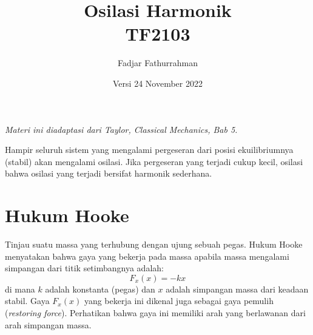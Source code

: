 




\title{Osilasi Harmonik \\
TF2103}
\author{Fadjar Fathurrahman}
\date{Versi 24 November 2022}
\maketitle

\emph{Materi ini diadaptasi dari Taylor, Classical Mechanics, Bab 5.}

Hampir seluruh sistem yang mengalami pergeseran dari posisi ekuilibriumnya
(stabil) akan mengalami osilasi.
Jika pergeseran yang terjadi cukup kecil, osilasi
bahwa osilasi yang terjadi bersifat harmonik sederhana.

\section{Hukum Hooke}

Tinjau suatu massa yang terhubung dengan ujung sebuah pegas. Hukum Hooke menyatakan
bahwa gaya yang bekerja pada massa apabila massa mengalami simpangan dari titik
setimbangnya adalah:
\begin{equation}
F_{x}(x) = -kx
\end{equation}
di mana $k$ adalah konstanta (pegas) dan $x$ adalah simpangan massa dari keadaan stabil.
Gaya $F_x(x)$ yang bekerja ini dikenal juga sebagai gaya pemulih (\textit{restoring force}).
Perhatikan bahwa gaya ini memiliki arah yang berlawanan dari arah simpangan massa.

